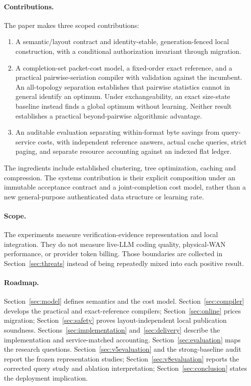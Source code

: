 \documentclass[11pt]{article}
\theoremstyle{definition}\newtheorem{definition}[theorem]{Definition}
\begin{document}
\paragraph{Contributions.}
The paper makes three scoped contributions:
\begin{enumerate}[leftmargin=1.6em,itemsep=1pt,topsep=2pt]
\item A semantic/layout contract and identity-stable, generation-fenced local
construction, with a conditional authorization invariant through migration.
\item A completion-set packet-cost model, a fixed-order exact reference,
and a practical pairwise-seriation compiler with validation against the incumbent.
An all-topology separation establishes that pairwise statistics cannot in
general identify an optimum. Under exchangeability, an exact size-state
baseline instead finds a global optimum without learning. Neither result
establishes a practical beyond-pairwise algorithmic advantage.
\item An auditable evaluation separating within-format byte savings from
query-service costs, with independent reference answers, actual cache queries,
strict paging, and separate resource accounting against an indexed flat ledger.
\end{enumerate}
The ingredients include established clustering, tree optimization, caching and
compression. The systems contribution is their explicit composition under
an immutable acceptance contract and a joint-completion cost model, rather
than a new general-purpose authenticated data structure or learning rate.

\paragraph{Scope.}
The experiments measure verification-evidence representation and local integration. They do not measure live-LLM coding quality, physical-WAN performance, or provider token billing. Those boundaries are collected in Section~\ref{sec:threats} instead of being repeatedly mixed into each positive result.

\paragraph{Roadmap.}
Section~\ref{sec:model} defines semantics and the cost model. Section~\ref{sec:compiler} develops the practical and exact-reference compilers; Section~\ref{sec:online} prices migration; Section~\ref{sec:safety} proves layout-independent local publication soundness. Sections~\ref{sec:implementation} and~\ref{sec:delivery} describe the implementation and service-matched accounting. Section~\ref{sec:evaluation} maps the research questions. Section~\ref{sec:v5evaluation} and the strong-baseline audit report the frozen representation studies; Section~\ref{sec:v8evaluation} reports the corrected query study and ablation interpretation; Section~\ref{sec:conclusion} states the deployment implication.
\end{document}
